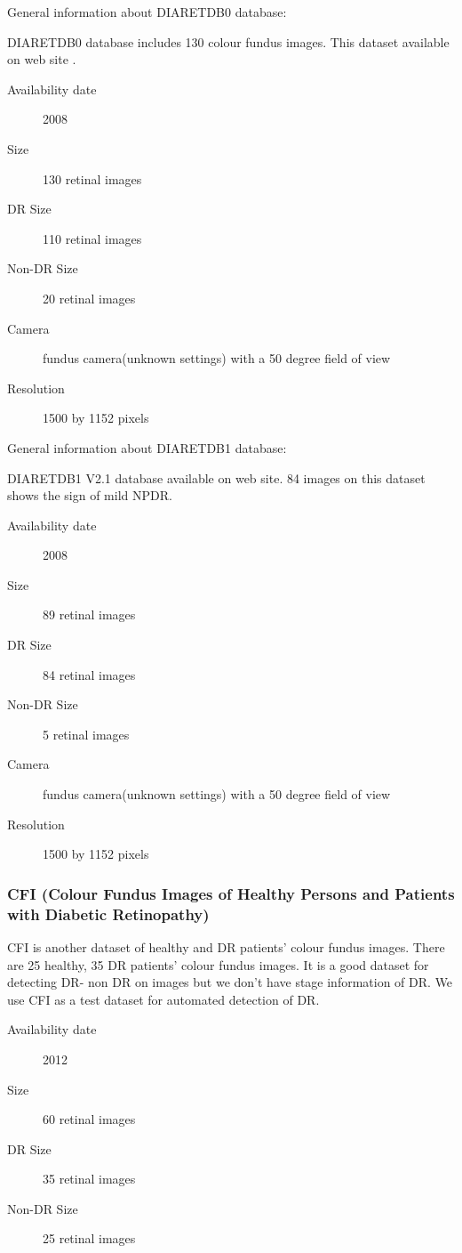 General information about DIARETDB0 database:

DIARETDB0 database includes 130 colour fundus images. This dataset available on \citet{DIARETDB0} web site \citep{kauppi2006diaretdb0}.

\begin{description}
    \item[Availability date] 2008
    \item[Size] 130 retinal images
    \item[DR Size] 110 retinal images
    \item[Non-DR Size] 20 retinal images
    \item[Camera] fundus camera(unknown settings) with a 50 degree field of view
    \item[Resolution] 1500 by 1152 pixels
\end{description}

General information about DIARETDB1 database:

DIARETDB1 V2.1 database \citep{kauppi2007diaretdb1} available on \citet{DIARETDB1V2_1} web site. 84 images on this dataset shows the sign of mild NPDR. 

\begin{description}
    \item[Availability date] 2008
    \item[Size] 89 retinal images
    \item[DR Size] 84 retinal images
    \item[Non-DR Size] 5 retinal images
    \item[Camera] fundus camera(unknown settings) with a 50 degree field of view
    \item[Resolution] 1500 by 1152 pixels
\end{description}


\subsubsection{CFI (Colour Fundus Images of Healthy Persons and Patients with Diabetic Retinopathy)}

CFI is another dataset \citep{CFI} of healthy and DR patients' colour fundus images. There are 25 healthy, 35 DR patients' colour fundus images. It is a good dataset for detecting DR- non DR on images but we don't have stage information of DR. \citep{alipour2012analysis} We use CFI as a test dataset for automated detection of DR. 

\begin{description}
    \item[Availability date] 2012
    \item[Size] 60 retinal images
    \item[DR Size] 35 retinal images
    \item[Non-DR Size] 25 retinal images
\end{description}

